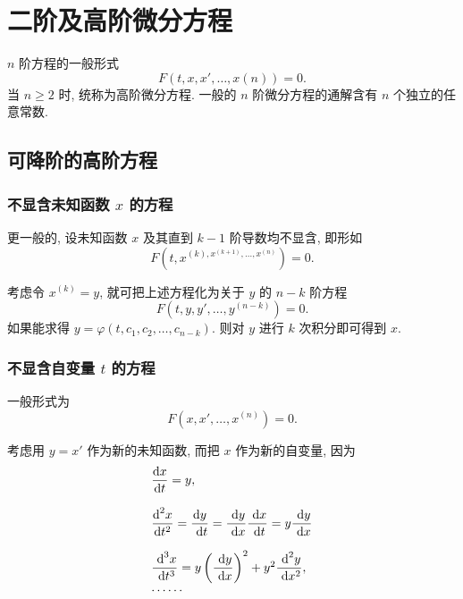\newpage
\chapter{二阶及高阶微分方程}

$n$ 阶方程的一般形式
\begin{equation}\label{高阶微分方程}
	F(t,x,x',\ldots,x(n))=0.
\end{equation}
当 $n\geqslant 2$ 时, 统称为高阶微分方程. 一般的 $n$ 阶微分方程的通解含有 $n$ 个独立的任意常数.

\section{可降阶的高阶方程}


\subsection{不显含未知函数 $x$ 的方程}

\begin{definition}
	更一般的, 设未知函数 $x$ 及其直到 $k-1$ 阶导数均不显含, 即形如
	\begin{equation}
		F(t,x^{(k),x^{(k+1)},\ldots,x^{(n)}})=0.
	\end{equation}
\end{definition}

考虑令 $x^{(k)}=y$, 就可把上述方程化为关于 $y$ 的 $n-k$ 阶方程
\begin{equation}
	F(t,y,y',\ldots,y^{(n-k)})=0.
\end{equation}
如果能求得 $y=\varphi(t,c_1,c_2,\ldots,c_{n-k})$.
则对 $y$ 进行 $k$ 次积分即可得到 $x$.

\subsection{不显含自变量 $t$ 的方程}

\begin{definition}
	一般形式为
	\begin{equation}
		F(x,x',\ldots,x^{(n)})=0.
	\end{equation}
\end{definition}

考虑用 $y=x'$ 作为新的未知函数, 而把 $x$ 作为新的自变量, 因为
$$
\begin{array}{l}
	\dfrac{\text {d} x}{\text {d} t} = y, \\
	\\
	\dfrac{\text {d} ^2 x}{\text {d} t^2}=\dfrac{\text {d} y}{\ \text {d} t}=\dfrac{\ \text {d} y}{\ \text {d} x}\dfrac{\ \text {d} x}{\ \text {d} t}=y\dfrac{\ \text {d} y}{\ \text {d} x} \\
	\\
	\dfrac{\ \text {d}^3 x}{\ \text {d} t^3}=y\left(\dfrac{\ \text {d} y}{\ \text {d} x}\right)^2+y^2\dfrac{\ \text {d}^2 y}{\ \text {d} x^2}, \\
	\cdots\cdots
\end{array}
$$

